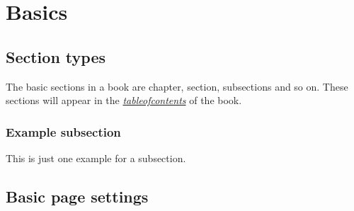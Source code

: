 \documentclass[a4paper,11pt,oneside]{book}
\newcommand{\imp}[1]{\underline{\textit{#1}}}
\begin{document}


\tableofcontents


\chapter{Basics}

\pagestyle{fancy}
\fancyhf{}
\fancyhead[OC]{\leftmark}
\fancyhead[EC]{\rightmark}
\cfoot{\thepage}


\section{Section types}

The basic sections in a book are chapter, section, subsections and so on. These sections will appear in the \imp{tableofcontents} of the book.


\subsection{Example subsection}

This is just one example for a subsection.


\section{Basic page settings}
\end{document}
